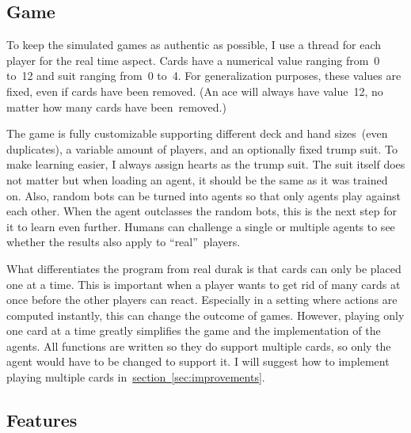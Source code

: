 \documentclass[a4paper,titlepage]{article}
\begin{document}
\subsection{Game}

To keep the simulated games as authentic as possible, I use a thread for each player for the real time aspect. Cards have a numerical value ranging from~0 to~12 and suit ranging from~0 to~4. For generalization purposes, these values are fixed, even if cards have been removed. (An ace will always have value~12, no matter how many cards have been~removed.)

The game is fully customizable supporting different deck and hand sizes~(even duplicates), a variable amount of players, and an optionally fixed trump suit. To make learning easier, I always assign hearts as the trump suit. The suit itself does not matter but when loading an agent, it should be the same as it was trained on. Also, random bots can be turned into agents so that only agents play against each other. When the agent outclasses the random bots, this is the next step for it to learn even further. Humans can challenge a single or multiple agents to see whether the results also apply to ``real''~players. 

What differentiates the program from real durak is that cards can only be placed one at a time. This is important when a player wants to get rid of many cards at once before the other players can react. Especially in a setting where actions are computed instantly, this can change the outcome of games. However, playing only one card at a time greatly simplifies the game and the implementation of the agents. All functions are written so they do support multiple cards, so only the agent would have to be changed to support it. I will suggest how to implement playing multiple cards in~\hyperref[sec:improvements]{section~\ref*{sec:improvements}}.

\subsection{Features}
\end{document}
